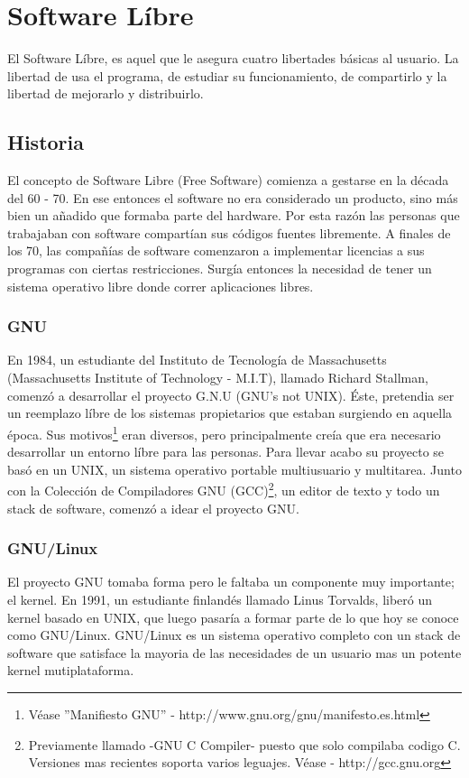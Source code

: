 \chapter{Software L\'ibre}

El Software L\'ibre, es aquel que le asegura cuatro libertades b\'asicas al
usuario. La libertad de usa el programa, de estudiar su funcionamiento, de
compartirlo y la libertad de mejorarlo y distribuirlo.

\section{Historia}
El concepto de Software Libre (Free Software) comienza a gestarse en la d\'ecada
del 60 - 70. En ese entonces el software no era considerado un producto, sino
m\'as bien un a\~nadido que formaba parte del hardware. Por esta raz\'on las
personas que trabajaban con software compart\'ian sus c\'odigos fuentes libremente.
A finales de los 70, las compa\~n\'ias de software comenzaron a implementar 
licencias a sus programas con ciertas restricciones. 
Surg\'ia entonces la necesidad de tener un sistema operativo libre donde correr 
aplicaciones libres.


\subsection{GNU}
En 1984, un estudiante del Instituto de Tecnolog\'ia de Massachusetts
(Massachusetts Institute of Technology - M.I.T), llamado Richard Stallman, 
comenz\'o a desarrollar el proyecto G.N.U (GNU's not UNIX).
\'Este, pretendia ser un reemplazo l\'ibre de los sistemas propietarios que 
estaban surgiendo en aquella \'epoca.
Sus motivos\footnote{V\'ease ''Manifiesto GNU'' - 
http://www.gnu.org/gnu/manifesto.es.html} eran diversos, pero principalmente 
cre\'ia que era necesario desarrollar un entorno l\'ibre para las personas.
Para llevar acabo su proyecto se bas\'o en un UNIX, un sistema operativo portable 
multiusuario y multitarea. Junto con la Colecci\'on de Compiladores GNU
(GCC)\footnote{Previamente llamado -GNU C Compiler- puesto que solo compilaba
codigo C. Versiones mas recientes soporta varios leguajes. V\'ease -
http://gcc.gnu.org}, un editor de texto y todo un stack de software, comenz\'o
a idear el proyecto GNU.

\subsection{GNU/Linux}
El proyecto GNU tomaba forma pero le faltaba un componente muy importante; el
kernel. 
En 1991, un estudiante finland\'es llamado Linus Torvalds, liber\'o un kernel
basado en UNIX, que luego pasar\'ia a formar parte de lo que hoy se conoce como
GNU/Linux.
GNU/Linux es un sistema operativo completo con un stack de software que
satisface la mayoria de las necesidades de un usuario mas un potente kernel
mutiplataforma.


